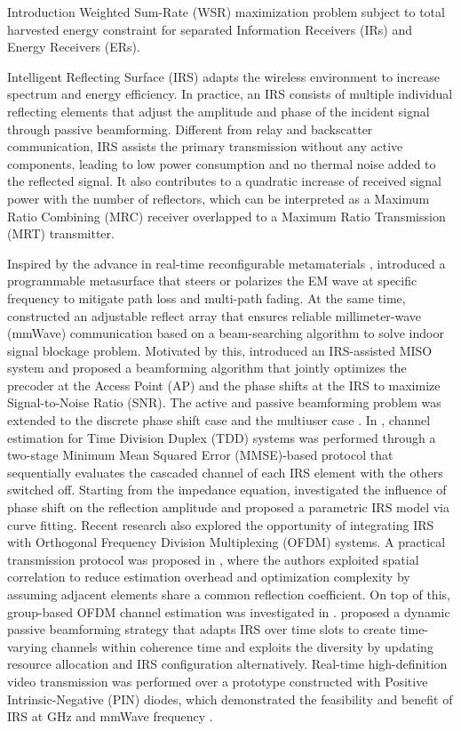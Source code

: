 \documentclass{IEEEtran}
\begin{document}
\begin{section}{Introduction}
Weighted Sum-Rate (WSR) maximization problem subject to total harvested energy constraint for separated Information Receivers (IRs) and Energy Receivers (ERs).

	Intelligent Reflecting Surface (IRS) adapts the wireless environment to increase spectrum and energy efficiency. In practice, an IRS consists of multiple individual reflecting elements that adjust the amplitude and phase of the incident signal through passive beamforming. Different from relay and backscatter communication, IRS assists the primary transmission without any active components, leading to low power consumption and no thermal noise added to the reflected signal. It also contributes to a quadratic increase of received signal power with the number of reflectors, which can be interpreted as a Maximum Ratio Combining (MRC) receiver overlapped to a Maximum Ratio Transmission (MRT) transmitter.

	Inspired by the advance in real-time reconfigurable metamaterials \cite{Cui2014}, \cite{Liaskos2018} introduced a programmable metasurface that steers or polarizes the EM wave at specific frequency to mitigate path loss and multi-path fading. At the same time, \cite{Tan2018} constructed an adjustable reflect array that ensures reliable millimeter-wave (mmWave) communication based on a beam-searching algorithm to solve indoor signal blockage problem. Motivated by this, \cite{Wu2018,Wu2019} introduced an IRS-assisted MISO system and proposed a beamforming algorithm that jointly optimizes the precoder at the Access Point (AP) and the phase shifts at the IRS to maximize Signal-to-Noise Ratio (SNR). The active and passive beamforming problem was extended to the discrete phase shift case \cite{Wu2019a} and the multiuser case \cite{Guo2019a}. In \cite{Nadeem2019}, channel estimation for Time Division Duplex (TDD) systems was performed through a two-stage Minimum Mean Squared Error (MMSE)-based protocol that sequentially evaluates the cascaded channel of each IRS element with the others switched off. Starting from the impedance equation, \cite{Abeywickrama2019} investigated the influence of phase shift on the reflection amplitude and proposed a parametric IRS model via curve fitting. Recent research also explored the opportunity of integrating IRS with Orthogonal Frequency Division Multiplexing (OFDM) systems. A practical transmission protocol was proposed in \cite{Yang2019}, where the authors exploited spatial correlation to reduce estimation overhead and optimization complexity by assuming adjacent elements share a common reflection coefficient. On top of this, group-based OFDM channel estimation was investigated in \cite{Zheng2019}. \cite{Yang2020} proposed a dynamic passive beamforming strategy that adapts IRS over time slots to create time-varying channels within coherence time and exploits the diversity by updating resource allocation and IRS configuration alternatively. Real-time high-definition video transmission was performed over a prototype constructed with Positive Intrinsic-Negative (PIN) diodes, which demonstrated the feasibility and benefit of IRS at GHz and mmWave frequency \cite{Dai2020}.


\end{section}
\end{document}
